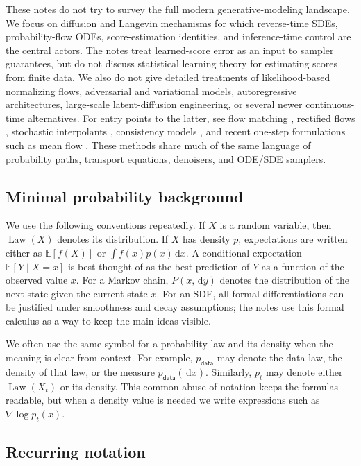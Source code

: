 \documentclass{amsart}
\numberwithin{equation}{section}
\theoremstyle{plain}
\theoremstyle{definition}
\theoremstyle{remark}
\DeclareMathOperator{\Law}{Law}
\newcommand{\E}{\mathbb{E}}
\newcommand{\dd}{\,\mathrm{d}}
\newcommand{\pdata}{p_{\mathsf{data}}}
\begin{document}
These notes do not try to survey the full modern generative-modeling
landscape.  We focus on diffusion and Langevin mechanisms for which reverse-time
SDEs, probability-flow ODEs, score-estimation identities, and inference-time
control are the central actors.  The notes treat learned-score error as an input
to sampler guarantees, but do not discuss statistical learning theory for estimating scores from finite data.  We also do
not give detailed treatments of likelihood-based normalizing flows, adversarial
and variational models, autoregressive architectures, large-scale
latent-diffusion engineering, or several newer continuous-time alternatives.
For entry points to the latter, see flow matching
\cite{lipman2022flowmatching}, rectified flows \cite{liu2022rectifiedflow},
stochastic interpolants \cite{albergo2023stochasticinterpolants},
consistency models \cite{song2023consistency}, and recent one-step
formulations such as mean flow \cite{geng2025meanflows}.  These
methods share much of the same language of probability paths, transport
equations, denoisers, and ODE/SDE samplers.


\subsection*{Minimal probability background}

We use the following conventions repeatedly.  If $X$ is a random variable, then
$\Law(X)$ denotes its distribution.  If $X$ has density $p$, expectations are
written either as $\E[f(X)]$ or $\int f(x)p(x)\dd x$.  A conditional expectation
$\E[Y\mid X=x]$ is best thought of as the best prediction of $Y$ as a function of the observed value $x$.  For
a Markov chain, $P(x,\dd y)$ denotes the distribution of the next state given
the current state $x$.  For an SDE, all formal differentiations can be justified
under smoothness and decay assumptions; the notes use this formal calculus as a
way to keep the main ideas visible.

We often use the same symbol for a probability law and its density when the
meaning is clear from context.  For example, $\pdata$ may denote the data law,
the density of that law, or the measure $\pdata(\dd x)$.  Similarly, $p_t$ may
denote either $\Law(X_t)$ or its density.  This common abuse of notation keeps
the formulas readable, but when a density value is needed we write expressions
such as $\nabla\log p_t(x)$.


\subsection*{Recurring notation}
\end{document}
